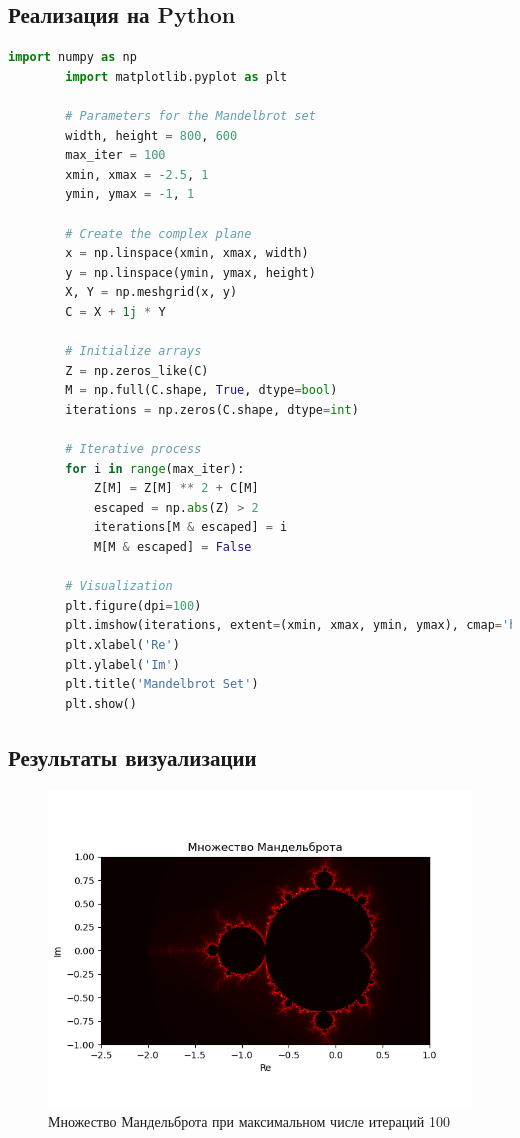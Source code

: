\documentclass{article}
\begin{document}
	\subsection{Реализация на Python}
	
	
	\begin{lstlisting}[language=Python, inputencoding=utf8]
		import numpy as np
		import matplotlib.pyplot as plt
		
		# Parameters for the Mandelbrot set
		width, height = 800, 600
		max_iter = 100
		xmin, xmax = -2.5, 1
		ymin, ymax = -1, 1
		
		# Create the complex plane
		x = np.linspace(xmin, xmax, width)
		y = np.linspace(ymin, ymax, height)
		X, Y = np.meshgrid(x, y)
		C = X + 1j * Y
		
		# Initialize arrays
		Z = np.zeros_like(C)
		M = np.full(C.shape, True, dtype=bool)
		iterations = np.zeros(C.shape, dtype=int)
		
		# Iterative process
		for i in range(max_iter):
			Z[M] = Z[M] ** 2 + C[M]
			escaped = np.abs(Z) > 2
			iterations[M & escaped] = i
			M[M & escaped] = False
		
		# Visualization
		plt.figure(dpi=100)
		plt.imshow(iterations, extent=(xmin, xmax, ymin, ymax), cmap='hot')
		plt.xlabel('Re')
		plt.ylabel('Im')
		plt.title('Mandelbrot Set')
		plt.show()
	\end{lstlisting}
	
	\newpage
	
	\subsection{Результаты визуализации}
	
	\begin{figure}[H]
		\centering
		\includegraphics[width=1\textwidth]{images/screenshot001}
		\caption{Множество Мандельброта при максимальном числе итераций 100}
		\label{fig:mandelbrot}
	\end{figure}
	
\end{document}
